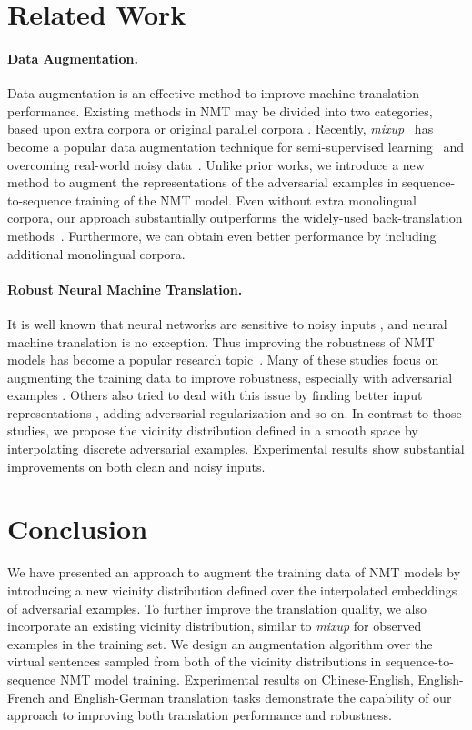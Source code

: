 \documentclass[11pt,a4paper]{article}
\newcommand{\mixup}{\textit{mixup}\xspace}
\begin{document}
\section{Related Work}
\paragraph{Data Augmentation.}
Data augmentation is an effective method to improve machine translation performance.
Existing methods in NMT may be divided into two categories, based upon extra corpora \cite{Sennrich:16b,Cheng:16,Zhang:16,Edunov:18} or original parallel corpora \cite{Fadaee:17,Wang:18,Cheng:19}. Recently, \mixup~\cite{Zhang:18} has become a popular data augmentation technique for semi-supervised learning~\cite{Berthelot:19} and overcoming real-world noisy data~\cite{Jiang:19}. Unlike prior works, we introduce a new method to augment the representations of the adversarial examples in sequence-to-sequence training of the NMT model.
Even without extra monolingual corpora, our approach substantially outperforms the widely-used back-translation methods~\cite{Sennrich:16b, Edunov:18}. Furthermore, we can obtain even better performance by including additional monolingual corpora.


\paragraph{Robust Neural Machine Translation.}
It is well known that neural networks are sensitive to noisy inputs \cite{Szegedy:14, Goodfellow:14}, and neural machine translation is no exception.
Thus improving the robustness of NMT models has become a popular research topic~\cite[e.g.,][]{Belinkov:17,Sperber:17, Ebrahimi:18b, Cheng:18, Cheng:19, Karpukhin:19, Li:19}. 
Many of these studies focus on augmenting the training data to improve robustness, especially with adversarial examples \cite{Ebrahimi:18b, Cheng:19, Karpukhin:19, Michel:19}. Others also tried to deal with this issue by finding better input representations \cite{Durrani:19}, adding adversarial regularization \cite{Sano:19} and so on. In contrast to those studies, we propose the vicinity distribution defined in a smooth space by interpolating discrete adversarial examples.
Experimental results show substantial improvements on both clean and noisy inputs.


\section{Conclusion}
We have presented an approach to augment the training data of NMT models by introducing a new vicinity distribution defined over the interpolated embeddings of adversarial examples. To further improve the translation quality, we also incorporate an existing vicinity distribution, similar to \mixup for observed examples in the training set. We design an augmentation algorithm over the virtual sentences sampled from both of the vicinity distributions in sequence-to-sequence NMT model training. Experimental results on Chinese-English, English-French and English-German translation tasks demonstrate the capability of our approach to improving both translation performance and robustness.


\balance

\end{document}
